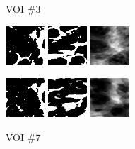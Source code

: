 \documentclass[journal]{IEEEtran}
\begin{document}
\begin{figure}[!htb]

  \centering
  \captionsetup[subfloat]{labelformat=empty}

  {\fontsize{9}{9}\selectfont VOI \#3} \vspace{1mm}

  \includegraphics[width=0.13\textwidth]
  {figure/all/dataset_3/roi_coronal}
  \includegraphics[width=0.13\textwidth]
  {figure/all/dataset_3/roi_saggital}
  \includegraphics[width=0.13\textwidth]
  {figure/all/dataset_3/proj_roi}

  \includegraphics[width=0.13\textwidth]
  {figure/all/dataset_3/model_coronal}
  \includegraphics[width=0.13\textwidth]
  {figure/all/dataset_3/model_saggital}
  \includegraphics[width=0.13\textwidth]
  {figure/all/dataset_3/proj_roi_inten10}

  {\fontsize{9}{9}\selectfont VOI \#7} \vspace{1mm}


\end{figure}
\end{document}
